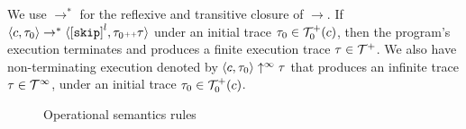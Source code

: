 We use $\to^*$ for the reflexive and transitive closure of $\to$. 
If $\config{c, \trace_0} \rightarrow^{*} \config{\clabel{\eskip}^l, \trace_0 \tracecat \trace}$ under an initial trace 
$\mathtt{\tau}_0 \in \mathcal{T}^{+}_0(c)$,
then the program's execution terminates and produces a finite execution trace $\mathtt{\tau} \in \mathcal{T}^{+}$. We also have non-terminating execution denoted by $\langle c, \mathtt{\tau}_0 \rangle \uparrow^{\infty} \mathtt{\tau}$ that produces an infinite trace $\mathtt{\tau} \in \mathcal{T}^{\infty}$, under an initial trace 
$\mathtt{\tau}_0 \in \mathcal{T}^{+}_0(c)$.
    \begin{figure}
\small{
}
\caption{Operational semantics rules}
\label{fig:command-os}
\end{figure}
